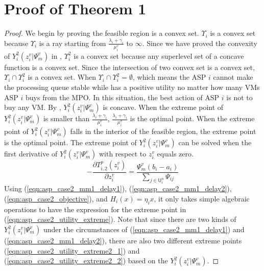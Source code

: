 \documentclass[10pt,journal, compsoc]{IEEEtran}
\begin{document}
  \section{Proof of Theorem 1}\label{appendix:theorem_1}
    \begin{proof}
    We begin by proving the feasible region is a convex set. $\Upsilon_i$ is a convex set because $\Upsilon_i$ is a ray starting from $\frac{\lambda_i+\gamma_i}{\mu_i^v}$ to $\infty$. Since we have proved the convexity of $Y_i^2(z_i^v|\Psi_m^v)$ in , $\Upsilon_i^2$ is a convex set because any superlevel set of a concave function is a convex set. Since the intersection of two convex set is a convex set, $\Upsilon_i \cap \Upsilon_i^2$ is a convex set. When $\Upsilon_i \cap \Upsilon_i^2 = \emptyset$, which means the ASP $i$ cannot make the processing queue stable while has a positive utility no matter how many VMs ASP $i$ buys from the MPO. In this situation, the best action of ASP $i$ is not to buy any VM. By , $Y_i^2(z_i^v|\Psi_m^v)$ is concave. When the extreme point of $Y_i^2(z_i^v|\Psi_m^v)$ is smaller than $\frac{\lambda_i+\gamma_i}{\mu_i^v}$, $\frac{\lambda_i+\gamma_i}{\mu_i^v}$ is the optimal point. When the extreme point of $Y_i^2(z_i^v|\Psi_m^v)$ falls in the interior of the feasible region, the extreme point is the optimal point. The extreme point of $Y_i^2(z_i^v|\Psi_m^v)$ can be solved when the first derivative of $Y_i^2(z_i^v|\Psi_m^v)$ with respect to $z_i^v$ equals zero.
    \begin{equation} \label{eqn:asp_case2_utility_first_deriv}
    -\frac{\partial T_{i,2}^p(z_i^v)}{\partial z_i^v} = \frac{\Psi_m^v (b_i - a_i)}{\sum_{j \in \mathsf{U}_i^n} \Psi_{ij}}
    \end{equation}
    Using (\ref{eqn:asp_case2_mm1_delay1}), (\ref{eqn:asp_case2_mm1_delay2}), (\ref{eqn:asp_case2_objective}), and $H_i(x)=\eta_i x$, it only takes simple algebraic operations to have the expression for the extreme point in (\ref{eqn:asp_case2_utility_extreme}). Note that since there are two kinds of $Y_i^2(z_i^v|\Psi_m^v)$ under the circumstances of (\ref{eqn:asp_case2_mm1_delay1}) and (\ref{eqn:asp_case2_mm1_delay2}), there are also two different extreme points (\ref{eqn:asp_case2_utility_extreme2_1}) and (\ref{eqn:asp_case2_utility_extreme2_2}) based on the $Y_i^2(z_i^v|\Psi_m^v)$.\qedhere
    \end{proof}
\end{document}
